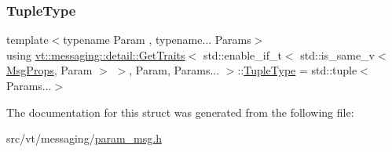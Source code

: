 \subsubsection{\texorpdfstring{Tuple\+Type}{TupleType}}
{\footnotesize\ttfamily template$<$typename Param , typename... Params$>$ \\
using \hyperlink{structvt_1_1messaging_1_1detail_1_1_get_traits}{vt\+::messaging\+::detail\+::\+Get\+Traits}$<$ std\+::enable\+\_\+if\+\_\+t$<$ std\+::is\+\_\+same\+\_\+v$<$ \hyperlink{structvt_1_1_msg_props}{Msg\+Props}, Param $>$ $>$, Param, Params... $>$\+::\hyperlink{structvt_1_1messaging_1_1detail_1_1_get_traits_3_01std_1_1enable__if__t_3_01std_1_1is__same__v_3bc2a71b1e6b5e202c9f9124c04edb776_a4e0a25f642928574ddf52e81760a90df}{Tuple\+Type} =  std\+::tuple$<$Params...$>$}



The documentation for this struct was generated from the following file\+:\begin{DoxyCompactItemize}
\item 
src/vt/messaging/\hyperlink{param__msg_8h}{param\+\_\+msg.\+h}\end{DoxyCompactItemize}
